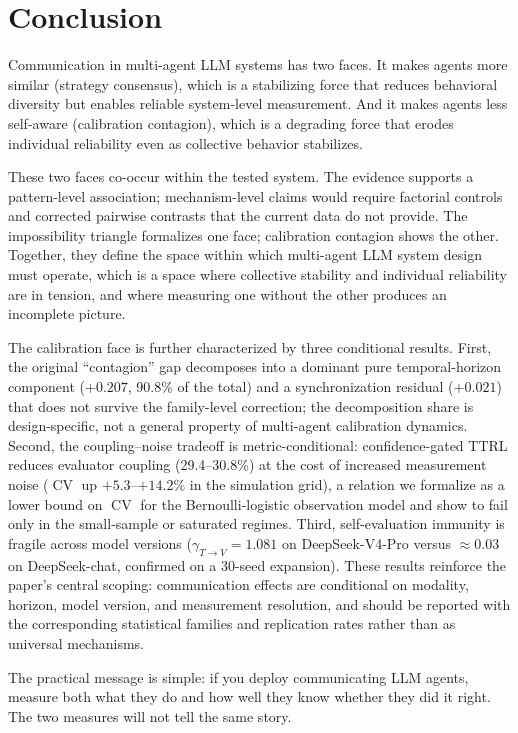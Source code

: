 \documentclass[11pt]{article}
\DeclareMathOperator{\CV}{CV}
\begin{document}
\section{Conclusion}

Communication in multi-agent LLM systems has two faces. It makes agents more similar (strategy consensus), which is a stabilizing force that reduces behavioral diversity but enables reliable system-level measurement. And it makes agents less self-aware (calibration contagion), which is a degrading force that erodes individual reliability even as collective behavior stabilizes.

These two faces co-occur within the tested system. The evidence supports a pattern-level association; mechanism-level claims would require factorial controls and corrected pairwise contrasts that the current data do not provide. The impossibility triangle formalizes one face; calibration contagion shows the other. Together, they define the space within which multi-agent LLM system design must operate, which is a space where collective stability and individual reliability are in tension, and where measuring one without the other produces an incomplete picture.

The calibration face is further characterized by three conditional results. First, the original ``contagion'' gap decomposes into a dominant pure temporal-horizon component ($+0.207$, 90.8\% of the total) and a synchronization residual ($+0.021$) that does not survive the family-level correction; the decomposition share is design-specific, not a general property of multi-agent calibration dynamics. Second, the coupling--noise tradeoff is metric-conditional: confidence-gated TTRL reduces evaluator coupling (29.4--30.8\%) at the cost of increased measurement noise ($\CV$ up $+5.3$--$+14.2\%$ in the simulation grid), a relation we formalize as a lower bound on $\CV$ for the Bernoulli-logistic observation model and show to fail only in the small-sample or saturated regimes. Third, self-evaluation immunity is fragile across model versions ($\gamma_{T\to V}{=}1.081$ on DeepSeek-V4-Pro versus $\approx 0.03$ on DeepSeek-chat, confirmed on a 30-seed expansion). These results reinforce the paper's central scoping: communication effects are conditional on modality, horizon, model version, and measurement resolution, and should be reported with the corresponding statistical families and replication rates rather than as universal mechanisms.

The practical message is simple: if you deploy communicating LLM agents, measure both what they do and how well they know whether they did it right. The two measures will not tell the same story.
\end{document}
